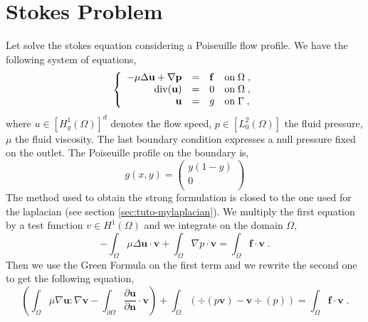 %

\section{Stokes Problem}
\label{sec:tuto-mystokes}

Let solve the stokes equation considering a Poiseuille flow profile. 
We have the following system of equations,
%
\begin{equation}
\left\{
\begin{array}{rcll}
-\mu\Delta \bf u + \nabla p & = & \bf f & \text{on}\; \Omega \;, \\
                \div(\bf u) & = & 0 & \text{on}\; \Omega \;, \\
                \bf u  & = & g & \text{on}\; \Gamma \;, \\
\end{array}
\right.
\label{eq:tuto-stk}
\end{equation}
%
where $u\in [H_g^1(\Omega)]^d$ denotes the flow speed, $p\in [L_0^2(\Omega)]$ the fluid pressure, $\mu$ the 
fluid viscosity.
The last boundary condition expresses a null pressure fixed
on the outlet. The Poiseuille profile on the boundary is,
%
\begin{equation}
g(x,y)=
\left(
\begin{array}{c}
 y(1-y) \\
 0      \\
\end{array}
\right)
\end{equation}
%
The method used to obtain the strong formulation is closed to the one used
for the laplacian (see section \ref{sec:tuto-mylaplacian}).
We multiply the first equation by a test function $v\in H^1(\Omega)$
and we integrate on the domain $\Omega$,
%
\begin{equation}
-\int_\Omega \mu \Delta \mathbf u \cdot \mathbf v
+\int_\Omega \nabla p \cdot \mathbf v
=\int_\Omega \mathbf f \cdot \mathbf v \;.
\end{equation}
%
Then we use the Green Formula on the first term and we rewrite the second one 
to get the following equation,
%
\begin{equation}
\left(
\int_\Omega \mu \nabla \mathbf u : \nabla \mathbf v
-\int_{\partial\Omega} \frac{\partial \mathbf u}{\partial \mathbf n} \cdot \mathbf v
\right)
+\int_\Omega ( \div(p \mathbf v) - \mathbf v \div(p) )
=\int_\Omega \mathbf f \cdot \mathbf v \;.
\label{eq:tuto-stk-1}
\end{equation}
